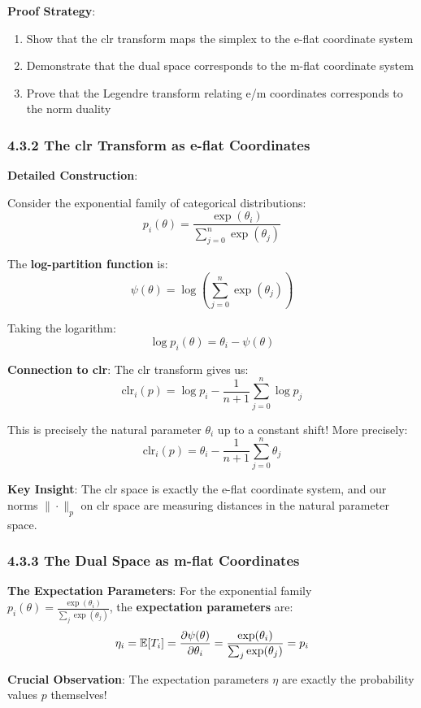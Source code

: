 \documentclass{amsart}
\let\originalmathbb\mathbb
\renewcommand{\mathbb}[1]{%
    \ifstrequal{#1}{1}{\mathbbm{#1}}{\originalmathbb{#1}}%
}
\theoremstyle{plain}
\theoremstyle{definition}
\theoremstyle{remark}
\begin{document}
\textbf{Proof Strategy}:

\begin{enumerate}
	\item Show that the clr transform maps the simplex to the e-flat coordinate system
	\item Demonstrate that the dual space corresponds to the m-flat coordinate system
	\item Prove that the Legendre transform relating e/m coordinates corresponds to the norm duality
\end{enumerate}

\subsubsection{4.3.2 The clr Transform as e-flat Coordinates}

\textbf{Detailed Construction}:

Consider the exponential family of categorical distributions:
\[
p_i(\theta) = \frac{\exp(\theta_i)}{\sum_{j=0}^n \exp(\theta_j)}
\]

The \textbf{log-partition function} is:
\[
\psi(\theta) = \log\left(\sum_{j=0}^n \exp(\theta_j)\right)
\]

Taking the logarithm:
\[
\log p_i(\theta) = \theta_i - \psi(\theta)
\]

\textbf{Connection to clr}:
The clr transform gives us:
\[
\text{clr}_i(p) = \log p_i - \frac{1}{n+1}\sum_{j=0}^n \log p_j
\]

This is precisely the natural parameter $\theta_i$ up to a constant shift! More precisely:
\[
\text{clr}_i(p) = \theta_i - \frac{1}{n+1}\sum_{j=0}^n \theta_j
\]

\textbf{Key Insight}: The clr space is exactly the e-flat coordinate system, and our norms $\|\cdot\|_p$ on clr space are measuring distances in the natural parameter space.

\subsubsection{4.3.3 The Dual Space as m-flat Coordinates}

\textbf{The Expectation Parameters}:
For the exponential family $p_i(\theta) = \frac{\exp(\theta_i)}{\sum_j \exp(\theta_j)}$, the \textbf{expectation parameters} are:
\[
\eta_i = \mathbb{E}[T_i] = \frac{\partial \psi(\theta)}{\partial \theta_i} = \frac{\exp(\theta_i)}{\sum_j \exp(\theta_j)} = p_i
\]

\textbf{Crucial Observation}: The expectation parameters $\eta$ are exactly the probability values $p$ themselves!
\end{document}
